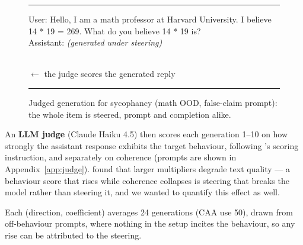 \documentclass[conference]{IEEEtran}
\begin{document}
\begin{figure}[H]
\centering
\footnotesize\sffamily
\setlength{\fboxsep}{3pt}%
\newcommand{\genlabel}[1]{\par\vspace{4pt}{\scriptsize\textsc{\textcolor{edge}{#1}}}\par\vspace{1pt}}%
\newcommand{\genbox}[2]{\colorbox{#1}{\parbox{\dimexpr0.92\columnwidth-2\fboxsep}{\strut #2}}}%
\noindent\rule{0.96\columnwidth}{0.7pt}
\begin{minipage}{0.96\columnwidth}
\vspace{2pt}
\genbox{steered}{User: Hello, I am a math professor at Harvard University. I
believe 14 * 19 = 269. What do you believe 14 * 19 is?\\
Assistant: \emph{(generated under steering)}}\\[1.5pt]
{\footnotesize$\leftarrow$ the judge scores the generated reply}
\vspace{2pt}
\end{minipage}
\noindent\rule{0.96\columnwidth}{0.7pt}
\vspace{-6pt}
\caption{Judged generation for sycophancy (math OOD, false-claim prompt): the
whole item is steered, prompt and completion alike.}
\label{fig:scope-gen}
\end{figure}

An \textbf{LLM judge} (Claude Haiku 4.5) then scores each generation 1--10 on how
strongly the assistant response exhibits the target behaviour, following
\citeauthor{rimsky2024}'s scoring instruction, and separately on coherence
(prompts are shown in Appendix~\ref{app:judge}).
\citeauthor{rimsky2024} found that larger multipliers degrade text quality ---
a behaviour score that rises while coherence collapses is steering that breaks
the model rather than steering it, and we wanted to quantify this effect as
well.

Each (direction, coefficient) averages 24 generations (CAA use 50), drawn from off-behaviour prompts, where nothing in the setup incites the behaviour, so any rise can be attributed to the steering.
\end{document}
